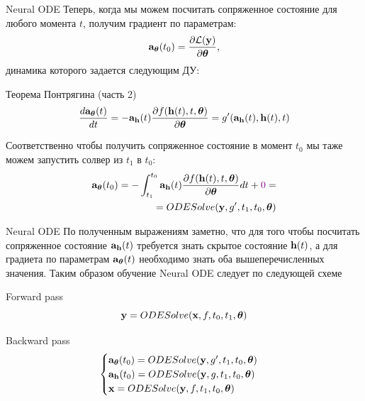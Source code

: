 \begin{frame}{Neural ODE}
    Теперь, когда мы можем посчитать сопряженное состояние для любого момента $t$, получим градиент по параметрам:
    \begin{displaymath}
        \mathbf{a}_{\boldsymbol{\theta}}(t_0) = \frac{\partial\mathcal{L}(\mathbf{y})}{\partial \boldsymbol{\theta}},
    \end{displaymath}
    динамика которого задается следующим ДУ:
    \begin{block}{Теорема Понтрягина (часть 2)}
        \begin{displaymath}
            \frac{d\mathbf{a}_{\boldsymbol{\theta}}(t)}{dt} = -\mathbf{a}_{\mathbf{h}}(t)\frac{\partial f(\mathbf{h}(t), t, \boldsymbol{\theta})}{\partial \boldsymbol{\theta}} = g'(\mathbf{a}_{\mathbf{h}}(t), \mathbf{h}(t), t)
        \end{displaymath}
    \end{block}
    Соответственно чтобы получить сопряженное состояние в момент $t_0$ мы таже можем запустить солвер из $t_1$ в $t_0$:
    \begin{displaymath}
        \begin{split}
            \mathbf{a}_{\boldsymbol{\theta}}(t_0) = -\int_{t_1}^{t_0}\mathbf{a}_{\mathbf{h}}(t)\frac{\partial f(\mathbf{h}(t), t, \boldsymbol{\theta})}{\partial \boldsymbol{\theta}}dt + {\color{violet}0} = \\ = ODESolve(\mathbf{y}, g', t_1, t_0, \boldsymbol{\theta})
        \end{split}
    \end{displaymath}
\end{frame}

\begin{frame}{Neural ODE}
    По полученным выражениям заметно, что для того чтобы посчитать сопряженное состояние  $\mathbf{a}_{\mathbf{h}}(t)$ требуется знать скрытое состояние $\mathbf{h}(t)$, а для градиета по параметрам $\mathbf{a}_{\boldsymbol{\theta}}(t)$ необходимо знать оба вышеперечисленных значения. Таким образом обучение Neural ODE следует по следующей схеме
    \begin{block}{Forward pass}
        \begin{displaymath}
        \mathbf{y} = ODESolve(\mathbf{x}, f, t_0, t_1, \boldsymbol{\theta})
    \end{displaymath}
    \end{block}
    \begin{block}{Backward pass}
        \begin{displaymath}
            \begin{cases} 
                \mathbf{a}_{\boldsymbol{\theta}}(t_0) = ODESolve(\mathbf{y}, g', t_1, t_0, \boldsymbol{\theta})
                \\ 
                \mathbf{a}_{\mathbf{h}}(t_0) = ODESolve(\mathbf{y}, g, t_1, t_0, \boldsymbol{\theta})
                \\
                \mathbf{x} = ODESolve(\mathbf{y}, f, t_1, t_0, \boldsymbol{\theta})
            \end{cases}
        \end{displaymath}
    \end{block}
\end{frame}


